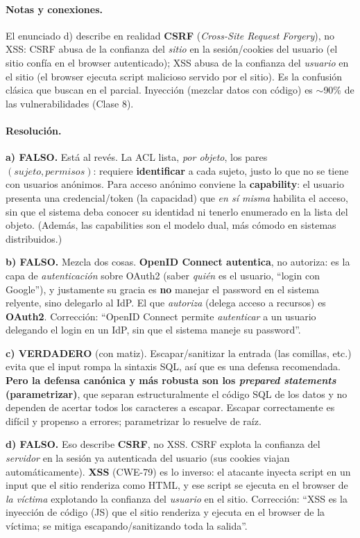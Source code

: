 \paragraph{Notas y conexiones.} El enunciado d) describe en realidad \textbf{CSRF}
(\emph{Cross-Site Request Forgery}), no XSS: CSRF abusa de la confianza del \emph{sitio} en la
sesión/cookies del usuario (el sitio confía en el browser autenticado); XSS abusa de la
confianza del \emph{usuario} en el sitio (el browser ejecuta script malicioso servido por el
sitio). Es la confusión clásica que buscan en el parcial. Inyección (mezclar datos con código)
es $\sim$90\% de las vulnerabilidades (Clase 8).

\paragraph{Resolución.}
\textbf{a) FALSO.} Está al revés. La ACL lista, \emph{por objeto}, los pares
$(sujeto,permisos)$: requiere \textbf{identificar} a cada sujeto, justo lo que no se tiene con
usuarios anónimos. Para acceso anónimo conviene la \textbf{capability}: el usuario presenta una
credencial/token (la capacidad) que \emph{en sí misma} habilita el acceso, sin que el sistema
deba conocer su identidad ni tenerlo enumerado en la lista del objeto. (Además, las capabilities
son el modelo dual, más cómodo en sistemas distribuidos.)

\medskip
\textbf{b) FALSO.} Mezcla dos cosas. \textbf{OpenID Connect autentica}, no autoriza: es la capa
de \emph{autenticación} sobre OAuth2 (saber \emph{quién} es el usuario, ``login con Google''),
y justamente su gracia es \textbf{no} manejar el password en el sistema relyente, sino delegarlo
al IdP. El que \emph{autoriza} (delega acceso a recursos) es \textbf{OAuth2}. Corrección:
``OpenID Connect permite \emph{autenticar} a un usuario delegando el login en un IdP, sin que el
sistema maneje su password''.

\medskip
\textbf{c) VERDADERO} (con matiz). Escapar/sanitizar la entrada (las comillas, etc.) evita que
el input rompa la sintaxis SQL, así que es una defensa recomendada. \textbf{Pero la defensa
canónica y más robusta son los \emph{prepared statements} (parametrizar)}, que separan
estructuralmente el código SQL de los datos y no dependen de acertar todos los caracteres a
escapar. Escapar correctamente es difícil y propenso a errores; parametrizar lo resuelve de
raíz.

\medskip
\textbf{d) FALSO.} Eso describe \textbf{CSRF}, no XSS. CSRF explota la confianza del
\emph{servidor} en la sesión ya autenticada del usuario (sus cookies viajan automáticamente).
\textbf{XSS} (CWE-79) es lo inverso: el atacante inyecta script en un input que el sitio
renderiza como HTML, y ese script se ejecuta en el browser de \emph{la víctima} explotando la
confianza del \emph{usuario} en el sitio. Corrección: ``XSS es la inyección de código (JS) que
el sitio renderiza y ejecuta en el browser de la víctima; se mitiga escapando/sanitizando toda
la salida''.

